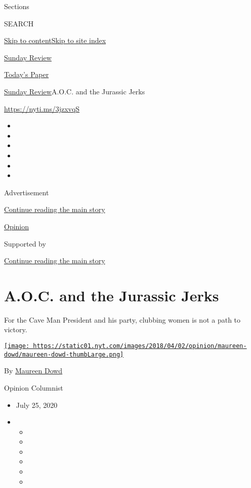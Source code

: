 Sections

SEARCH

\protect\hyperlink{site-content}{Skip to
content}\protect\hyperlink{site-index}{Skip to site index}

\href{https://www.nytimes.com/section/opinion/sunday}{Sunday Review}

\href{https://myaccount.nytimes.com/auth/login?response_type=cookie\&client_id=vi}{}

\href{https://www.nytimes.com/section/todayspaper}{Today's Paper}

\href{/section/opinion/sunday}{Sunday Review}\textbar{}A.O.C. and the
Jurassic Jerks

\href{https://nyti.ms/3jzxvqS}{https://nyti.ms/3jzxvqS}

\begin{itemize}
\item
\item
\item
\item
\item
\item
\end{itemize}

Advertisement

\protect\hyperlink{after-top}{Continue reading the main story}

\href{/section/opinion}{Opinion}

Supported by

\protect\hyperlink{after-sponsor}{Continue reading the main story}

\hypertarget{aoc-and-the-jurassic-jerks}{%
\section{A.O.C. and the Jurassic
Jerks}\label{aoc-and-the-jurassic-jerks}}

For the Cave Man President and his party, clubbing women is not a path
to victory.

\href{https://www.nytimes.com/by/maureen-dowd}{\texttt{[image: https://static01.nyt.com/images/2018/04/02/opinion/maureen-dowd/maureen-dowd-thumbLarge.png]}}

By \href{https://www.nytimes.com/by/maureen-dowd}{Maureen Dowd}

Opinion Columnist

\begin{itemize}
\item
  July 25, 2020
\item
  \begin{itemize}
  \item
  \item
  \item
  \item
  \item
  \item
  \end{itemize}
\end{itemize}

